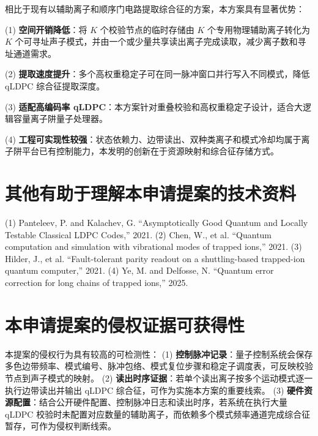 \documentclass[12pt,a4paper]{article}
\begin{document}
相比于现有以辅助离子和顺序门电路提取综合征的方案，本方案具有显著优势：

(1) \textbf{空间开销降低}：将 $K$ 个校验节点的临时存储由 $K$ 个专用物理辅助离子转化为 $K$ 个可寻址声子模式，并由一个或少量共享读出离子完成读取，减少离子数和寻址通道需求。

(2) \textbf{提取速度提升}：多个高权重稳定子可在同一脉冲窗口并行写入不同模式，降低 qLDPC 综合征提取深度。

(3) \textbf{适配高编码率 qLDPC}：本方案针对重叠校验和高权重稳定子设计，适合大逻辑容量离子阱量子处理器。

(4) \textbf{工程可实现性较强}：状态依赖力、边带读出、双种类离子和模式冷却均属于离子阱平台已有控制能力，本发明的创新在于资源映射和综合征存储方式。

\section{其他有助于理解本申请提案的技术资料}

(1) Panteleev, P. and Kalachev, G. ``Asymptotically Good Quantum and Locally Testable Classical LDPC Codes,'' 2021.
(2) Chen, W., et al. ``Quantum computation and simulation with vibrational modes of trapped ions,'' 2021.
(3) Hilder, J., et al. ``Fault-tolerant parity readout on a shuttling-based trapped-ion quantum computer,'' 2021.
(4) Ye, M. and Delfosse, N. ``Quantum error correction for long chains of trapped ions,'' 2025.

\section{本申请提案的侵权证据可获得性}

本提案的侵权行为具有较高的可检测性：
(1) \textbf{控制脉冲记录}：量子控制系统会保存多色边带频率、模式编号、脉冲包络、模式复位步骤和稳定子调度表，可反映校验节点到声子模式的映射。
(2) \textbf{读出时序证据}：若单个读出离子按多个运动模式逐一执行边带读出并输出 qLDPC 综合征，可作为实施本方案的重要线索。
(3) \textbf{硬件资源配置}：结合公开硬件配置、控制脉冲日志和读出时序，若系统在执行大量 qLDPC 校验时未配置对应数量的辅助离子，而依赖多个模式频率通道完成综合征暂存，可作为侵权判断线索。
\end{document}

